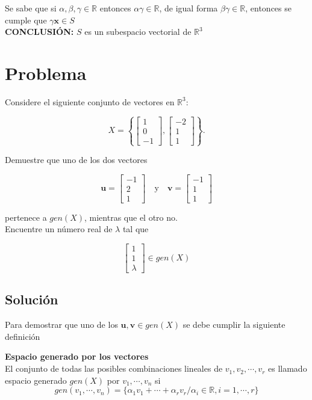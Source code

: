 Se sabe que si ${\alpha},{\beta},{\gamma} \in \mathbb{R}$ entonces ${\alpha}{\gamma} \in \mathbb{R}$, de igual forma ${\beta}{\gamma} \in \mathbb{R}$, entonces se cumple que $\gamma \mathbf{x} \in S$ \\

\textbf{CONCLUSIÓN: }$S$ es un subespacio vectorial de $\mathbb{R}^3$

\section{Problema}

Considere el siguiente conjunto de vectores en $\mathbb{R}^3$:

\[
X = \left\{ 
\begin{bmatrix}
1 \\ 
0 \\ 
-1
\end{bmatrix}
,
\begin{bmatrix}
-2 \\ 
1 \\ 
1
\end{bmatrix} \right\}.
\]

Demuestre que uno de los dos vectores

\[
\mathbf{u} = 
\begin{bmatrix}
-1 \\ 
2 \\ 
1
\end{bmatrix}
\quad
\text{y}
\quad
\mathbf{v} = 
\begin{bmatrix}
-1 \\ 
1 \\ 
1
\end{bmatrix}
\]

pertenece a $gen(X)$, mientras que el otro no.\\
Encuentre un número real de $\lambda$ tal que

\[
\begin{bmatrix}
1 \\ 
1 \\ 
\lambda
\end{bmatrix}
\in gen(X)
\]

\subsection{Solución}
Para demostrar que uno de los $\mathbf{u},\mathbf{v} \in gen(X)$ se debe cumplir la siguiente definición

\begin{defi}\textbf{Espacio generado por los vectores}
    \\
    El conjunto de todas las posibles combinaciones lineales de ${v}_{1} , {v}_{2} , \cdots , {v}_{r}$ es llamado espacio generado $gen(X)$ por ${v}_{1} , \cdots , {v}_{n}$ si
    $$
    gen({v}_{1} , \cdots , {v}_{n} ) = \{ {\alpha}_{1} {v}_{1} + \cdots + {\alpha}_{r} {v}_{r} / {\alpha}_{i} \in \mathbb{R} , i = 1 , \cdots , r \}
    $$
\end{defi}
